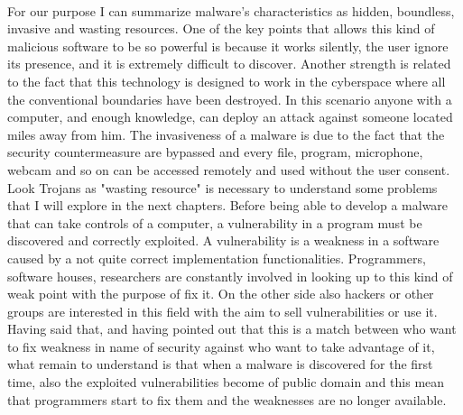 \paragraph{}
For our purpose I can summarize malware's characteristics as hidden, boundless, invasive and wasting resources. One of the key points that allows this kind of malicious software to be so powerful is because it works silently, the user ignore its presence, and it is extremely difficult to discover. Another strength is related to the fact that this technology is designed to work in the cyberspace where all the conventional boundaries have been destroyed. In this scenario anyone with a computer, and enough knowledge, can deploy an attack against someone located miles away from him. The invasiveness of a malware is due to the fact that the security countermeasure are bypassed and every file, program, microphone, webcam and so on can be accessed remotely and used without the user consent. Look Trojans as "wasting resource" \cite{malware_as_wasting_resource} is necessary to understand some problems that I will explore in the next chapters. Before being able to develop a malware that can take controls of a computer, a vulnerability in a program must be discovered and correctly exploited. A vulnerability is a weakness in a software caused by a not quite correct implementation functionalities. Programmers, software houses, researchers are constantly involved in looking up to this kind of weak point with the purpose of fix it. On the other side also hackers or other groups are interested in this field with the aim to sell vulnerabilities or use it. Having said that, and having pointed out that this is a match between who want to fix weakness in name of security against who want to take advantage of it, what remain to understand is that when a malware is discovered for the first time, also the exploited vulnerabilities  become of public domain and this mean that programmers start to fix them and the weaknesses are no longer available.

